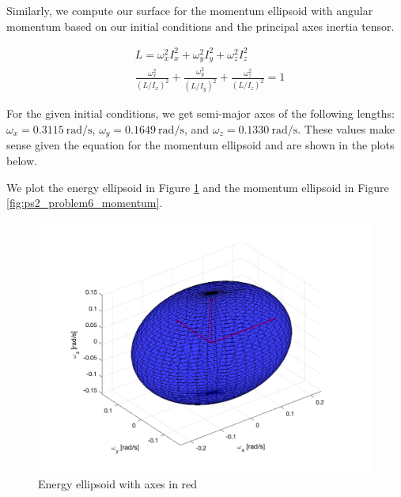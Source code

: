 Similarly, we compute our surface for the momentum ellipsoid with angular momentum based on our initial conditions and the principal axes inertia tensor.

\begin{align*}
    &L = \omega_{x}^{2} I_{x}^{2} + \omega_{y}^{2} I_{y}^{2} + \omega_{z}^{2} I_{z}^{2} \\
    &\frac{\omega_{x}^{2}}{(L/I_{x})^{2}} + \frac{\omega_{y}^{2}}{(L/I_{y})^{2}} + \frac{\omega_{z}^{2}}{(L/I_{z})^{2}} = 1
\end{align*}

For the given initial conditions, we get semi-major axes of the following lengths: $\omega_{x} = \qty{0.3115}{\radian\per\second}$, $\omega_{y} = \qty{0.1649}{\radian\per\second}$, and $\omega_{z} = \qty{0.1330}{\radian\per\second}$. These values make sense given the equation for the momentum ellipsoid and are shown in the plots below.

We plot the energy ellipsoid in Figure \ref{fig:ps2_problem6_energy} and the momentum ellipsoid in Figure \ref{fig:ps2_problem6_momentum}.

\begin{figure}[H]
\centering
\includegraphics[scale=0.65]{Images/ps2_problem6_energy.png}
\caption{Energy ellipsoid with axes in red}
\label{fig:ps2_problem6_energy}
\end{figure}

